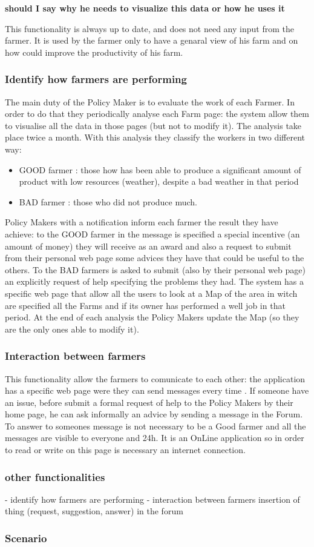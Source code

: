 \documentclass{article}
\begin{document}
\textbf{should I say why he needs to visualize this data or how he uses it}
\newline

This functionality is always up to date, and does not need 
any input from the farmer.
It is used by the farmer only to have a genaral view of 
his farm and on how could improve the productivity of his farm.



\subsubsection{Identify how farmers are performing}
The main duty of the Policy Maker is to evaluate the work of each Farmer. 
In order to do that they periodically analyse each Farm page: the system allow them to visualise all the  data in those pages (but not to modify it).
The analysis take place twice a month.
With this analysis they classify the workers in two different way:
\begin{itemize}
    \item GOOD farmer : those how has been able to produce a significant amount of product with low resources (weather), despite a bad weather in that period
    \item BAD farmer : those who did not produce much.
\end{itemize}
Policy Makers with a notification inform each farmer the result they have achieve: 
to the GOOD farmer in the message is specified a special incentive (an amount of money) they will receive as an award and also a request to submit from their personal web page some advices they have that could be useful to the others. 
To the BAD farmers is asked to submit (also by their personal web page) an explicitly request of help specifying the problems they had.
The system has a specific web page that allow all the users to look at a Map of the area in witch are specified all the Farms and if its owner has performed a well job in that period.
At the end of each analysis the Policy Makers update the Map (so they are the only ones able to modify it).



\subsubsection{Interaction between farmers}
This functionality allow the farmers to comunicate to each other: 
the application has a specific web page were they can send messages every time .
If someone have an issue, before submit a formal request of help to the Policy Makers by their home page, he can ask informally an advice by sending a message in the Forum.
To answer to someones message is not necessary to be a Good farmer and all the messages are visible to everyone and 24h. 
It is an OnLine application so in order to read or write on this page is necessary an internet connection.


\subsubsection{other functionalities}
- identify how farmers are performing
- interaction between farmers
insertion of thing (request, suggestion, answer) in the forum

\subsubsection{Scenario}
\end{document}
